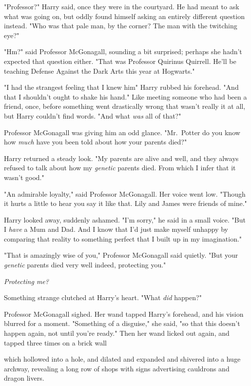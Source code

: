 "Professor?" Harry said, once they were in the courtyard. He had meant to ask
what was going on, but oddly found himself asking an entirely different
question instead. "Who was that pale man, by the corner? The man with the
twitching eye?"

"Hm?" said Professor McGonagall, sounding a bit surprised; perhaps she hadn't
expected that question either. "That was Professor Quirinus Quirrell. He'll be
teaching Defense Against the Dark Arts this year at Hogwarts."

"I had the strangest feeling that I knew him{\el}" Harry rubbed his
forehead. "And that I shouldn't ought to shake his hand." Like meeting someone
who had been a friend, once, before something went drastically wrong{\el}
that wasn't really it at all, but Harry couldn't find words. "And what
\emph{was{\el}} all of that?"

Professor McGonagall was giving him an odd glance. "Mr.~Potter{\el} do you
know{\el} how \emph{much} have you been told{\el} about how your parents
died?"

Harry returned a steady look. "My parents are alive and well, and they always
refused to talk about how my \emph{genetic} parents died. From which I infer
that it wasn't good."

"An admirable loyalty," said Professor McGonagall. Her voice went low. "Though
it hurts a little to hear you say it like that. Lily and James were friends of
mine."

Harry looked away, suddenly ashamed. "I'm sorry," he said in a small voice.
"But I \emph{have} a Mum and Dad. And I know that I'd just make myself unhappy
by comparing that reality to{\el} something perfect that I built up in my
imagination."

"That is amazingly wise of you," Professor McGonagall said quietly. "But your
\emph{genetic} parents died very well indeed, protecting you."

\emph{Protecting me?}

Something strange clutched at Harry's heart. "What{\el} \emph{did} happen?"

Professor McGonagall sighed. Her wand tapped Harry's forehead, and his vision
blurred for a moment. "Something of a disguise," she said, "so that this
doesn't happen again, not until you're ready." Then her wand licked out again,
and tapped three times on a brick wall{\el}

{\el} which hollowed into a hole, and dilated and expanded and shivered into
a huge archway, revealing a long row of shops with signs advertising cauldrons
and dragon livers.


